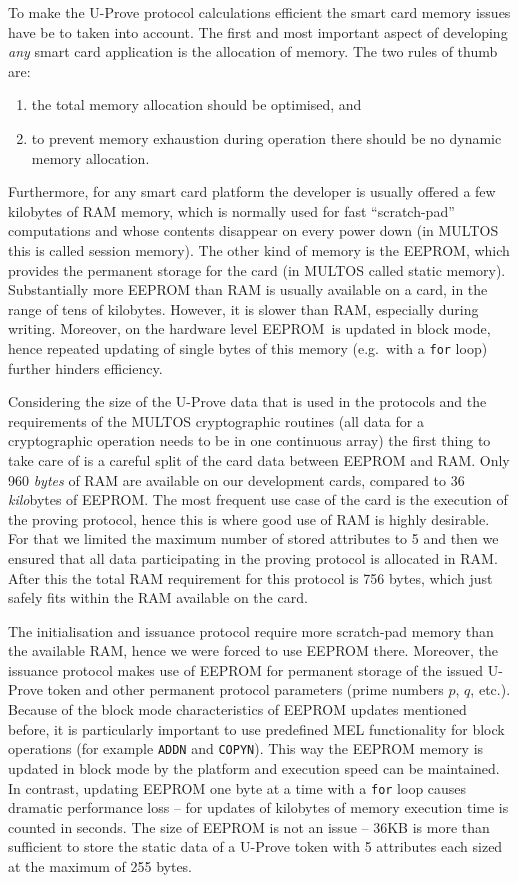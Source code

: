 To make the U-Prove protocol calculations efficient the smart card
memory issues have be to taken into account.
The first and most important aspect of developing \emph{any} smart card
application is the allocation of memory. The two rules of thumb are:
\begin{enumerate}
  \item the total memory allocation should be optimised, and
  \item to prevent memory exhaustion during operation there should be no
    dynamic memory allocation.
\end{enumerate}
Furthermore, for any smart card platform the developer is usually offered a few
kilobytes of RAM memory, which is normally used for fast ``scratch-pad''
computations and whose contents disappear on every power down (in MULTOS
this is called session memory). The other kind of memory is the EEPROM,
which provides the permanent storage for the card (in MULTOS called static
memory). Substantially more EEPROM than RAM is usually available on a
card, in the range of tens of kilobytes. However, it is slower than RAM,
especially during writing. Moreover, on the hardware level EEPROM\
is updated in block mode, hence repeated updating of single bytes of this
memory (e.g.\ with a \lstinline{for} loop) further hinders efficiency.

Considering the size of the U-Prove data that is used in the protocols and the
requirements of the MULTOS cryptographic routines (all data for a cryptographic
operation needs to be in one continuous array) the first thing to take care of
is a careful split of the card data between EEPROM and RAM. Only 960
\emph{bytes} of RAM are available on our development cards, compared to
36 \emph{kilo}bytes of EEPROM. The most frequent use case of the card is the
execution of the proving protocol, hence this is where good use of RAM is highly
desirable. For that we limited the maximum number of stored attributes to 5 and
then we ensured that all data participating in the proving protocol is allocated
in RAM. After this the total RAM requirement for this protocol is 756 bytes,
which just safely fits within the RAM available on the card.

The initialisation and issuance protocol require more scratch-pad memory than
the available RAM, hence we were forced to use EEPROM there. Moreover, the
issuance protocol makes use of EEPROM for permanent storage of the issued
U-Prove token and other permanent protocol parameters (prime numbers $p$, $q$,
etc.). Because of the block mode characteristics of EEPROM updates mentioned
before, it is particularly important to use predefined MEL functionality for
block operations (for example \lstinline{ADDN} and \lstinline{COPYN}). This
way the EEPROM memory is updated in block mode by the platform and execution
speed can be maintained. In contrast, updating EEPROM one byte at a time with a
\lstinline{for} loop causes dramatic performance loss -- for updates of
kilobytes of memory execution time is counted in seconds. The size of EEPROM is
not an issue -- 36KB is more than sufficient to store the static data of a
U-Prove token with 5 attributes each sized at the maximum of 255 bytes.

